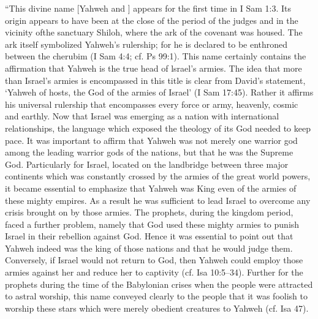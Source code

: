 \begin{compactdesc}
\begin{compactitem}
						\item ``This divine name [Yahweh and ] appears for the first time in I Sam 1:3. Its origin appears to have been at the close of the period of the judges and in the vicinity ofthe sanctuary Shiloh, where the ark of the covenant was housed. The ark itself symbolized Yahweh's rulership; for he is declared to be enthroned between the cherubim (I Sam 4:4; cf. Ps 99:1). This name certainly contains the affirmation that Yahweh is the true head of lsrael's armies. The idea that more than Israel's armies is encompassed in this title is clear from David's statement, `Yahweh of hosts, the God of the armies of Israel' (I Sam 17:45). Rather it affirms his universal rulership that encompasses every force or army, heavenly, cosmic and earthly. Now that Israel was emerging as a nation with international relationships, the language which exposed the theology of its God needed to keep pace. It was important to affirm that Yahweh was not merely one warrior god among the leading warrior gods of the nations, but that he was the Supreme God. Particularly for Israel, located on the landbridge between three major continents which was constantly crossed by the armies of the great world powers, it became essential to emphasize that Yahweh was King even of the armies of these mighty empires. As a result he was sufficient to lead Israel to overcome any crisis brought on by those armies. The prophets, during the kingdom period, faced a further problem, namely that God used these mighty armies to punish Israel in their rebellion against God. Hence it was essential to point out that Yahweh indeed was the king of those nations and that he would judge them. Conversely, if Israel would not return to God, then Yahweh could employ those armies against her and reduce her to captivity (cf. Isa 10:5--34). Further for the prophets during the time of the Babylonian crises when the people were attracted to astral worship, this name conveyed clearly to the people that it was foolish to worship these stars which were merely obedient creatures to Yahweh (cf. Isa 47).

\end{compactitem}
\end{compactdesc}
